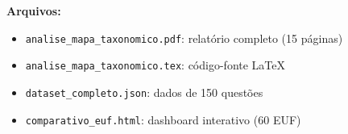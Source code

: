 \documentclass[
  brazilian,
  12pt,
]{article}
\begin{document}
\vspace{0.3cm}
\noindent\textbf{Arquivos:}
\begin{itemize}
  \item \texttt{analise\_mapa\_taxonomico.pdf}: relatório completo (15 páginas)
  \item \texttt{analise\_mapa\_taxonomico.tex}: código-fonte LaTeX
  \item \texttt{dataset\_completo.json}: dados de 150 questões
  \item \texttt{comparativo\_euf.html}: dashboard interativo (60 EUF)
\end{itemize}
\end{document}
